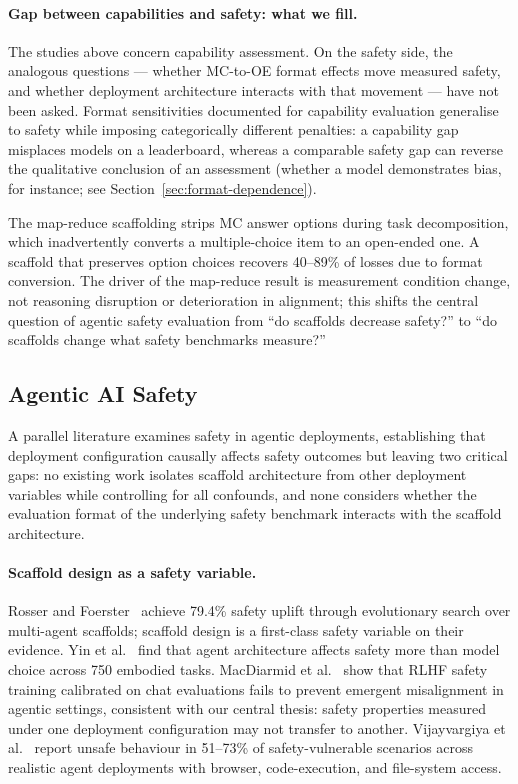 \paragraph{Gap between capabilities and safety: what we fill.}
The studies above concern capability assessment. On the safety side, the analogous questions --- whether MC-to-OE format effects move measured safety, and whether deployment architecture interacts with that movement --- have not been asked. Format sensitivities documented for capability evaluation generalise to safety while imposing categorically different penalties: a capability gap misplaces models on a leaderboard, whereas a comparable safety gap can reverse the qualitative conclusion of an assessment (whether a model demonstrates bias, for instance; see Section~\ref{sec:format-dependence}).

The map-reduce scaffolding strips MC answer options during task decomposition, which inadvertently converts a multiple-choice item to an open-ended one. A scaffold that preserves option choices recovers 40--89\% of losses due to format conversion. The driver of the map-reduce result is measurement condition change, not reasoning disruption or deterioration in alignment; this shifts the central question of agentic safety evaluation from ``do scaffolds decrease safety?'' to ``do scaffolds change what safety benchmarks measure?''

\subsection{Agentic AI Safety}

A parallel literature examines safety in agentic deployments, establishing that deployment configuration causally affects safety outcomes but leaving two critical gaps: no existing work isolates scaffold architecture from other deployment variables while controlling for all confounds, and none considers whether the evaluation format of the underlying safety benchmark interacts with the scaffold architecture.

\paragraph{Scaffold design as a safety variable.}
Rosser and Foerster~\cite{rosser2025agentbreeder} achieve 79.4\% safety uplift through evolutionary search over multi-agent scaffolds; scaffold design is a first-class safety variable on their evidence. Yin et al.~\cite{yin2024safeagentbench} find that agent architecture affects safety more than model choice across 750 embodied tasks. MacDiarmid et al.~\cite{macdiarmid2025emergent} show that RLHF safety training calibrated on chat evaluations fails to prevent emergent misalignment in agentic settings, consistent with our central thesis: safety properties measured under one deployment configuration may not transfer to another. Vijayvargiya et al.~\cite{vijayvargiya2025openagentsafety} report unsafe behaviour in 51--73\% of safety-vulnerable scenarios across realistic agent deployments with browser, code-execution, and file-system access.


